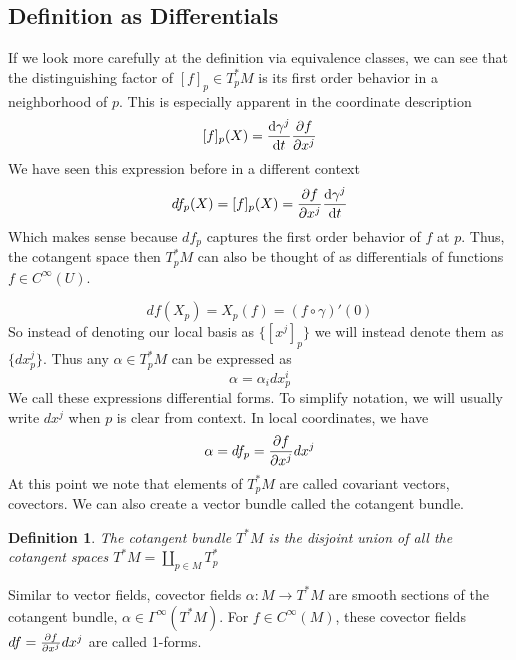 \documentclass[a4paper]{article}
\newtheorem*{defn}{Definition}
\begin{document}
\subsection*{Definition as Differentials}%
  
If we look more carefully at the definition via equivalence classes, we can see that the distinguishing factor of $[f]_p \in T_p^*M$ is its first order behavior in a neighborhood of $p$. This is especially apparent in the coordinate description
\[
  [f]_p(X) = \dv{\gamma^j}{t}\pdv{f}{x^j}
\]
We have seen this expression before in a different context
\[
  df_p(X) = [f]_p(X) = \pdv{f}{x^j}\dv{\gamma^j}{t}
\]
Which makes sense because $df_p$ captures the first order behavior of $f$ at $p$. Thus, the cotangent space then $T_p^*M$ can also be thought of as differentials of functions $f \in C^{\infty}(U)$.

  \[
    df(X_p) = X_p(f) = (f \circ \gamma)'(0)
  \]
  So instead of denoting our local basis as $\{[x^j]_p\}$ we will instead denote them as $\{dx^j_p\}$.
  Thus any $\alpha \in T_p^*M$ can be expressed as 
  \[
    \alpha = \alpha_i dx^i_p
  \]
  We call these expressions differential forms. To simplify notation, we will usually write $dx^j$ when $p$ is clear from context. In local coordinates, we have
  \[
    \alpha = df_p = \pdv{f}{x^j} dx^j
  \]
  At this point we note that elements of $T_p^*M$ are called covariant vectors, covectors. We can also create a vector bundle called the cotangent bundle. 
   \begin{defn}
     The cotangent bundle $T^*M$ is the disjoint union of all the cotangent spaces $T^*M = \coprod_{p \in M} T^*_p$
   \end{defn}
  
   Similar to vector fields, covector fields $\alpha: M \rightarrow T^*M$ are smooth sections of the cotangent bundle, $\alpha \in \Gamma^{\infty}(T^*M)$. For $f \in C^{\infty}(M)$, these covector fields $df = \pdv{f}{x^j} dx^j$ are called 1-forms.
\end{document}
